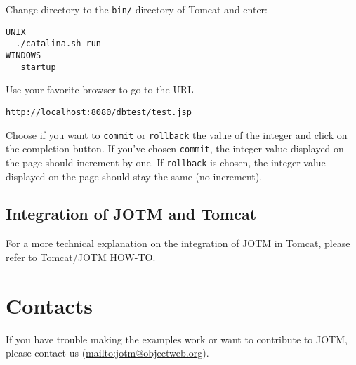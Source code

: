 \documentclass[a4paper,11pt]{article}
\begin{document}
Change directory to the \texttt{bin/} directory of Tomcat and enter:
\begin{verbatim}
UNIX
  ./catalina.sh run
WINDOWS
   startup
\end{verbatim}

Use your favorite browser to go to the URL
\begin{verbatim}
http://localhost:8080/dbtest/test.jsp
\end{verbatim}

\noindent Choose if you want to \texttt{commit} or \texttt{rollback} the 
value of the integer and click on the completion button.  
If you've chosen \texttt{commit}, the integer value displayed on the page should
increment by one. If \texttt{rollback} is chosen, the integer value displayed
on the page should stay the same (no increment). 

\subsection{Integration of JOTM and Tomcat}
\label{sec:tomcat_jotm_integration}

For a more technical explanation on the integration of JOTM in Tomcat,
please refer to Tomcat/JOTM HOW-TO. 

\section{Contacts}
\label{sec:contacts}

If you have trouble making the examples work or want to
contribute to JOTM, please contact us (\url{mailto:jotm@objectweb.org}).
\end{document}
